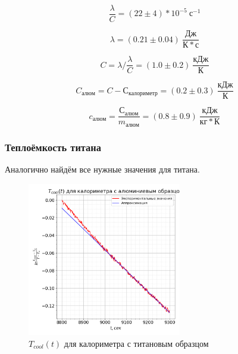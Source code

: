 \documentclass[a4paper, 12pt]{article}
\begin{document}
                \begin{equation*}
                    \frac{\lambda}{C} = (22 \pm 4)*10^{-5}~с^{-1}
                \end{equation*}

                \begin{equation*}
                    \lambda = (0.21 \pm 0.04)~\frac{Дж}{К*с}
                \end{equation*}

                \begin{equation*}
                    C = \lambda / \frac{\lambda}{C} = (1.0 \pm 0.2)~\frac{кДж}{К}
                \end{equation*}

                \begin{equation*}
                    C_{алюм} = C - С_{калориметр} = (0.2 \pm 0.3)~\frac{кДж}{К}
                \end{equation*}

                \begin{equation*}
                    c_{алюм} = \frac{С_{алюм}}{m_{алюм}} = (0.8 \pm 0.9)~\frac{кДж}{кг*К}
                \end{equation*}

            \subsubsection{Теплоёмкость титана}

                Аналогично найдём все нужные значения для титана.

                \begin{figure}[ht]
                    \centering
                    \includegraphics[width=0.6\textwidth]{img/graph_cool_3.png}
                    \caption{$T_{cool}(t)$ для калориметра с титановым образцом}
                    \label{plot:T_cool_3}
                \end{figure}
\end{document}
